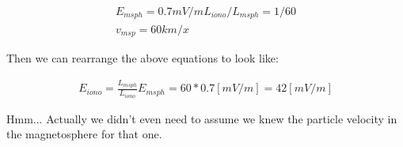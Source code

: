 \begin{gather*}
  E_{msph} = 0.7 mV/m
  L_{iono}/L_{msph} = 1/60 \\
  v_{msp} = 60 km/x
\end{gather*}

Then we can rearrange the above equations to look like:

\begin{gather*}
  E_{iono} = \frac{L_{msph}}{L_{iono}}E_{msph}
  = 60*0.7 [mV/m] = 42 [mV/m]
\end{gather*}

Hmm... Actually we didn't even need to assume we knew the particle
velocity in the magnetosphere for that one. 
